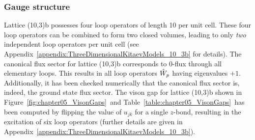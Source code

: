 %
%
\subsubsection{Gauge structure}
%
%
Lattice (10,3)b possesses four loop operators of length 10 per unit cell.
These four loop operators can be combined to form two closed volumes, leading to only \textit{two} independent loop operators per unit cell (see Appendix~\ref{appendix:ThreeDimensionalKitaevModels_10_3b} for details).
The canonical flux sector for lattice (10,3)b corresponds to $0$-flux through all elementary loops.
This results in all loop operators $\hat{W}_p$ having eigenvalues $+1$.
Additionally, it has been checked numerically that the canonical flux sector is, indeed, the ground state flux sector.
The vison gap for lattice (10,3)b shown in Figure~\ref{fig:chapter05_VisonGaps}~and Table~\ref{table:chapter05_VisonGaps}~has been computed by flipping the value of $u_{jk}$ for a single $z$-bond, resulting in the excitation of six loop operators (further details are given in Appendix~\ref{appendix:ThreeDimensionalKitaevModels_10_3b}).


%
%
